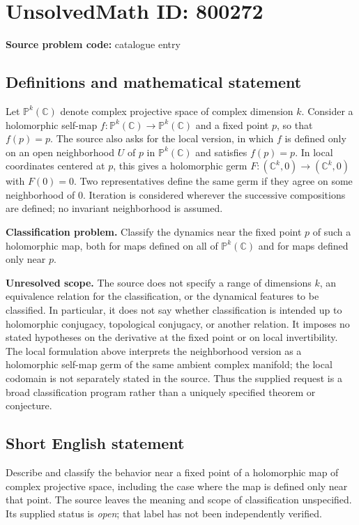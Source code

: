 \documentclass[11pt]{article}
\newcommand{\C}{\mathbb{C}}
\newcommand{\PP}{\mathbb{P}}
\begin{document}
\section*{UnsolvedMath ID: 800272}
\textbf{Source problem code:} catalogue entry
\subsection{Definitions and mathematical statement}
Let $\PP^k(\C)$ denote complex projective space of complex dimension $k$. Consider a holomorphic self-map $f\colon\PP^k(\C)\to\PP^k(\C)$ and a fixed point $p$, so that $f(p)=p$. The source also asks for the local version, in which $f$ is defined only on an open neighborhood $U$ of $p$ in $\PP^k(\C)$ and satisfies $f(p)=p$. In local coordinates centered at $p$, this gives a holomorphic germ $F\colon(\C^k,0)\to(\C^k,0)$ with $F(0)=0$. Two representatives define the same germ if they agree on some neighborhood of $0$. Iteration is considered wherever the successive compositions are defined; no invariant neighborhood is assumed.

\textbf{Classification problem.} Classify the dynamics near the fixed point $p$ of such a holomorphic map, both for maps defined on all of $\PP^k(\C)$ and for maps defined only near $p$.

\textbf{Unresolved scope.} The source does not specify a range of dimensions $k$, an equivalence relation for the classification, or the dynamical features to be classified. In particular, it does not say whether classification is intended up to holomorphic conjugacy, topological conjugacy, or another relation. It imposes no stated hypotheses on the derivative at the fixed point or on local invertibility. The local formulation above interprets the neighborhood version as a holomorphic self-map germ of the same ambient complex manifold; the local codomain is not separately stated in the source. Thus the supplied request is a broad classification program rather than a uniquely specified theorem or conjecture.
\subsection{Short English statement}
Describe and classify the behavior near a fixed point of a holomorphic map of complex projective space, including the case where the map is defined only near that point. The source leaves the meaning and scope of classification unspecified. Its supplied status is \emph{open}; that label has not been independently verified.
\end{document}
